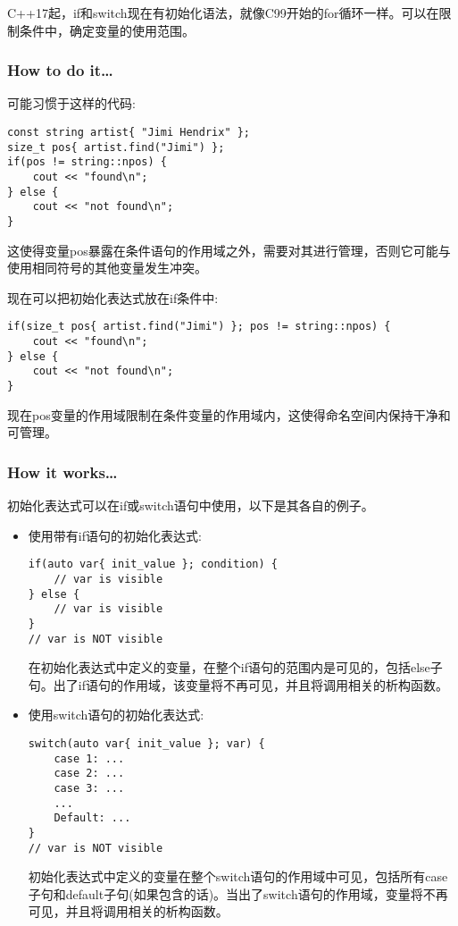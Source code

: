 
C++17起，if和switch现在有初始化语法，就像C99开始的for循环一样。可以在限制条件中，确定变量的使用范围。

\subsubsection{How to do it…}

可能习惯于这样的代码:

\begin{lstlisting}[style=styleCXX]
const string artist{ "Jimi Hendrix" };
size_t pos{ artist.find("Jimi") };
if(pos != string::npos) {
	cout << "found\n";
} else {
	cout << "not found\n";
}
\end{lstlisting}

这使得变量pos暴露在条件语句的作用域之外，需要对其进行管理，否则它可能与使用相同符号的其他变量发生冲突。

现在可以把初始化表达式放在if条件中:

\begin{lstlisting}[style=styleCXX]
if(size_t pos{ artist.find("Jimi") }; pos != string::npos) {
	cout << "found\n";
} else {
	cout << "not found\n";
}
\end{lstlisting}

现在pos变量的作用域限制在条件变量的作用域内，这使得命名空间内保持干净和可管理。

\subsubsection{How it works…}

初始化表达式可以在if或switch语句中使用，以下是其各自的例子。

\begin{itemize}
\item 
使用带有if语句的初始化表达式:

\begin{lstlisting}[style=styleCXX]
if(auto var{ init_value }; condition) {
	// var is visible
} else {
	// var is visible
}
// var is NOT visible
\end{lstlisting}

在初始化表达式中定义的变量，在整个if语句的范围内是可见的，包括else子句。出了if语句的作用域，该变量将不再可见，并且将调用相关的析构函数。

\item 
使用switch语句的初始化表达式:

\begin{lstlisting}[style=styleCXX]
switch(auto var{ init_value }; var) {
	case 1: ...
	case 2: ...
	case 3: ...
	...
	Default: ...
}
// var is NOT visible
\end{lstlisting}

初始化表达式中定义的变量在整个switch语句的作用域中可见，包括所有case子句和default子句(如果包含的话)。当出了switch语句的作用域，变量将不再可见，并且将调用相关的析构函数。

\end{itemize}

